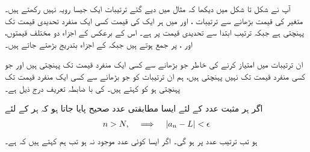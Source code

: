 آپ نے شکل  تا شکل  میں دیکھا کہ مثال  میں دیے گئے ترتیبات ایک جیسا رویہ نہیں رکھتے ہیں۔  متغیر  کی قیمت بڑھانے سے ترتیبات ،  اور  میں ہر ایک کی قیمت کسی ایک منفرد تحدیدی قیمت تک پہنچتی ہے جبکہ ترتیب  ابتدا سے تحدیدی قیمت پر ہے۔ اس کے برعکس  کے اجزاء دو مختلف قیمتوں،  اور ، پر جمع ہوتے ہیں جبکہ  کے اجزاء بتدریج بڑھتے جاتے ہیں۔ 

ان ترتیبات میں امتیاز کرنے کی خاطر جو  بڑھانے سے کسی ایک منفرد قیمت  تک پہنچتی ہیں اور جو کسی منفرد قیمت تک نہیں پہنچتی ہیں، ہم ان ترتیبات کو جو  بڑھانے سے کسی ایک منفرد قیمت  تک پہنچتی ہو کو  کہتے ہیں۔  کی با ضابطہ تعریف درج ذیل ہے۔ 

اگر ہر مثبت عدد  کے لئے ایسا  مطابقتی عدد صحیح  پایا جاتا ہو کہ ہر  کے لئے
\begin{align*}
n>N,\quad \implies \quad \abs{a_n-L}<\epsilon
\end{align*}
ہو تب ترتیب  عدد  پر  ہو گی۔ اگر ایسا کوئی عدد  موجود نہ ہو تب ہم کہتے ہیں کہ   ہے۔

